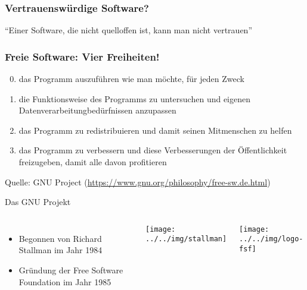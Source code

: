 \begin{frame}
    \frametitle{Vertrauenswürdige Software?}
    \begin{center}\Large
        \enquote{Einer Software, die nicht quelloffen ist, kann man nicht vertrauen}
    \end{center}
\end{frame}

\begin{frame}
	\frametitle{Freie Software: Vier Freiheiten!}

	\begin{enumerate}
		\setcounter{enumi}{-1}
		\item das Programm auszuführen wie man möchte, für jeden Zweck
		\item die Funktionsweise des Programms zu untersuchen und eigenen Datenverarbeitungbedürfnissen anzupassen 
		\item das Programm zu redistribuieren und damit seinen Mitmenschen zu helfen
		\item das Programm zu verbessern und diese Verbesserungen der Öffentlichkeit freizugeben, damit alle davon profitieren
	\end{enumerate}
	
	Quelle: GNU Project (\url{https://www.gnu.org/philosophy/free-sw.de.html})
\end{frame}

\begin{frame}{Das GNU Projekt}
  \begin{columns}
    \column{6cm}

    \begin{itemize}
      \item Begonnen von Richard Stallman im Jahr 1984 
      \item Gründung der Free Software Foundation im Jahr 1985 
    \end{itemize}

    \column{7cm}

    \begin{center}
      \texttt{[image: ../../img/stallman]}
    \par\end{center}

    \begin{center}
      \texttt{[image: ../../img/logo-fsf]}
    \par\end{center}
  \end{columns}
\end{frame}

